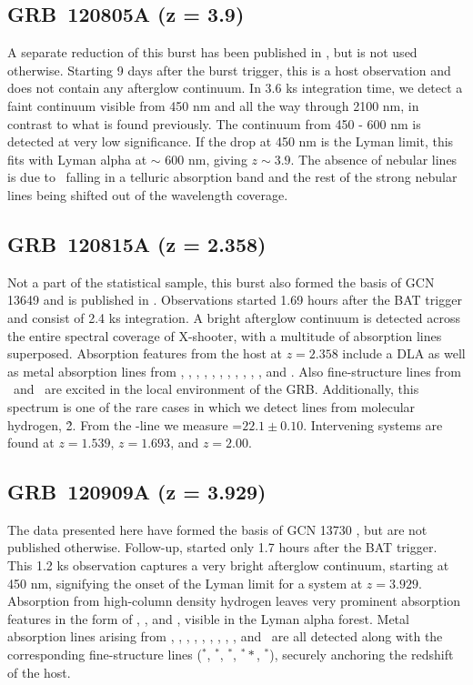\documentclass[longauth]{aa}    %
\begin{document}
\subsection{GRB~120805A (z = 3.9)} \label{120805}

A separate reduction of this burst has been published in \citet{Kruhler2015},
but is not used otherwise. Starting 9 days after the burst trigger, this is a host
observation and does not contain any afterglow continuum. In 3.6 ks integration
time, we detect a faint continuum visible from 450 nm and all the way through
2100 nm, in contrast to what is found previously. The continuum from 450 - 600
nm is detected at very low significance. If the drop at 450 nm is the Lyman
limit, this fits with Lyman alpha at $\sim$ 600 nm, giving $z \sim 3.9$. The
absence of nebular lines is due to \oii~falling in a telluric absorption band
and the rest of the strong nebular lines being shifted out of the wavelength coverage.

\subsection{GRB~120815A (z = 2.358)} \label{120815}

Not a part of the statistical sample, this burst also formed the basis of GCN
13649 \citep{GCN13649} and is published in \citet{Kruhler2013}. Observations
started 1.69 hours after the BAT trigger and consist of 2.4 ks integration. A
bright afterglow continuum is detected across the entire spectral coverage of
X-shooter, with a multitude of absorption lines superposed. Absorption features
from the host at $z = 2.358$ include a DLA as well as metal absorption lines
from \nv, \sii, \SIii, \oi, \civ, \SIiv, \feii, \alii, \aliii, \mnii, \mgii, and
\mgi. Also fine-structure lines from \NIii~and \feii~are excited in the local
environment of the GRB. Additionally, this spectrum is one of the rare cases in
which we detect lines from molecular hydrogen, \h2. From the \lya-line we
measure \nh=$22.1\pm0.10$. Intervening systems are found at $z = 1.539$, $z =
1.693$, and $z = 2.00$.

\subsection{GRB~120909A (z = 3.929)} \label{120909}

The data presented here have formed the basis of GCN 13730 \citep{GCN13730}, but
are not published otherwise. Follow-up, started only 1.7 hours after the BAT
trigger. This 1.2 ks observation captures a very bright afterglow continuum,
starting at 450 nm, signifying the onset of the Lyman limit for a system at $z =
3.929$. Absorption from high-column density hydrogen leaves very prominent
absorption features in the form of \lya, \lyb, and \lyg, visible in the Lyman
alpha forest. Metal absorption lines arising from \feii, \NIii, \SIii, \sii,
\alii, \aliii, \cii, \oi, \civ, and \znii~are all detected along with the
corresponding fine-structure lines (\feii$^*$, \SIii$^*$, \oi$^*$, \oi$^**$,
\cii$^*$), securely anchoring the redshift of the host.
\end{document}
